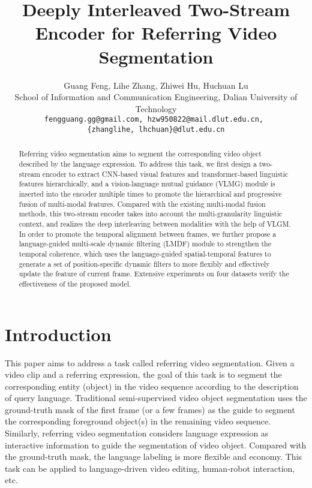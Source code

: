 \documentclass[10pt,twocolumn,letterpaper]{article}
\begin{document}
\title{Deeply Interleaved Two-Stream Encoder for Referring Video Segmentation}




\author{Guang Feng, Lihe Zhang\footnotemark[2], Zhiwei Hu, Huchuan Lu\\
\small School of Information and Communication Engineering, Dalian University of Technology \\
{\tt\small fengguang.gg@gmail.com, hzw950822@mail.dlut.edu.cn, }\\
{\tt\small \{zhanglihe, lhchuan\}@dlut.edu.cn}\\
}
\maketitle
\thispagestyle{empty}
\renewcommand{\thefootnote}{\fnsymbol{footnote}}

\begin{abstract}
   Referring video segmentation aims to segment the corresponding video object described by the language expression. To address this task, we first design a two-stream encoder to extract CNN-based visual features and transformer-based linguistic features hierarchically, and a vision-language mutual guidance (VLMG) module is inserted into the encoder multiple times to promote the hierarchical and progressive fusion of multi-modal features. Compared with the existing multi-modal fusion methods, this two-stream encoder takes into account the multi-granularity linguistic context, and realizes the deep interleaving between modalities with the help of VLGM. In order to promote the temporal alignment between frames, we further propose a language-guided multi-scale dynamic filtering (LMDF) module to strengthen the temporal coherence, which uses the language-guided spatial-temporal features to generate a set of position-specific dynamic filters to more flexibly and effectively update the feature of current frame. Extensive experiments on four datasets verify the effectiveness of the proposed model.
\end{abstract}

\section{Introduction}
\label{sec:intro}

This paper aims to address a task called referring video segmentation. Given a video clip and a referring expression, the goal of this task is to segment the corresponding entity (object) in the video sequence according to the description of query language. Traditional semi-supervised video object segmentation uses the ground-truth mask of the first frame (or a few frames) as the guide to segment the corresponding foreground object(s) in the remaining video sequence. Similarly, referring video segmentation considers language expression as interactive information to guide the segmentation of video object. Compared with the ground-truth mask, the language labeling is more flexible and economy. This task can be applied to language-driven video editing, human-robot interaction, etc.
\end{document}
